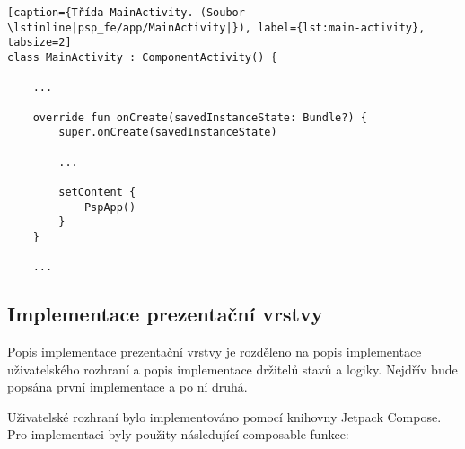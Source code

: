 \begin{lstlisting}[caption={Třída MainActivity. (Soubor \lstinline|psp_fe/app/MainActivity|}), label={lst:main-activity}, tabsize=2]
class MainActivity : ComponentActivity() {

	...
	
	override fun onCreate(savedInstanceState: Bundle?) {
		super.onCreate(savedInstanceState)
		
		...
		
		setContent {
			PspApp()
		}
	}

	...
\end{lstlisting}

\subsection {Implementace prezentační vrstvy}
\label{sssec:impl-ui}
Popis implementace prezentační vrstvy je rozděleno na popis implementace uživatelského rozhraní a popis implementace držitelů stavů a logiky. Nejdřív bude popsána první implementace a po ní druhá. 

Uživatelské rozhraní bylo implementováno pomocí knihovny Jetpack Compose. Pro implementaci byly použity následující composable funkce:


